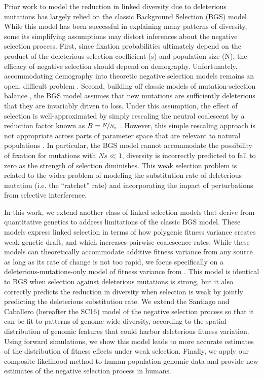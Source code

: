 \documentclass[11pt]{article}
\begin{document}
Prior work to model the reduction in linked diversity due to deleterious
mutations has largely relied on the classic Background Selection (BGS) model
\parencite{Charlesworth1993-gb,Nordborg1996-nq,Hudson1995-pt,Hudson1995-xc}.
While this model has been successful in explaining many patterns of diversity,
some its simplifying assumptions may distort inferences about the negative
selection process. First, since fixation probabilities ultimately depend on the
product of the deleterious selection coefficient (s) and population size (N),
the efficacy of negative selection should depend on demography. Unfortunately,
accommodating demography into theoretic negative selection models remains an
open, difficult problem \parencite{Zeng2013-ep,Johri2020-oj}. Second, building
off classic models of mutation-selection balance
\parencite{Crow1970-wm,Kimura1966-bk}, the BGS model assumes that new mutations
are sufficiently deleterious that they are invariably driven to loss. Under
this assumption, the effect of selection is well-approximated by simply
rescaling the neutral coalescent by a reduction factor known as $B =
\nicefrac{N}{N_e}$ \parencite{Charlesworth2013-kl}. However, this simple
rescaling approach is not appropriate across parts of parameter space that are
relevant to natural populations \parencite{McVean2000-bt,Good2014-yz}. In
particular, the BGS model cannot accommodate the possibility of fixation for
mutations with $Ns \ll 1$, diversity is incorrectly predicted to fall to zero
as the strength of selection diminishes. This weak selection problem is related
to the wider problem of modeling the substitution rate of deleterious mutation
(i.e. the “ratchet” rate) and incorporating the impact of perturbations from
selective interference.

In this work, we extend another class of linked selection models that derive
from quantitative genetics to address limitations of the classic BGS model.
These models express linked selection in terms of how polygenic fitness
variance creates weak genetic draft, and which increases pairwise coalescence
rates. While these models can theoretically accommodate additive fitness
variance from any source as long as its rate of change is not too rapid, we
focus specifically on a deleterious-mutations-only model of fitness variance
from \textcite{Santiago2016-mu}. This model is identical to BGS when selection
against deleterious mutations is strong, but it also correctly predicts the
reduction in diversity when selection is weak by jointly predicting the
deleterious substitution rate. We extend the Santiago and Caballero (hereafter
the SC16) model of the negative selection process so that it can be fit to
patterns of genome-wide diversity, according to the spatial distribution of
genomic features that could harbor deleterious fitness variation. Using forward
simulations, we show this model leads to more accurate estimates of the
distribution of fitness effects under weak selection. Finally, we apply our
composite-likelihood method to human population genomic data and provide new
estimates of the negative selection process in humans.
\end{document}
